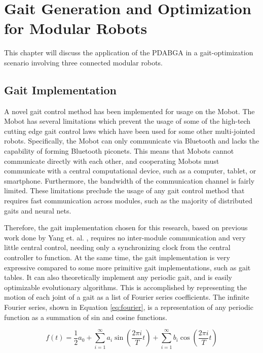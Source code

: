 \chapter{Gait Generation and Optimization for Modular Robots}
  This chapter will discuss the application of the PDABGA in a gait-optimization
    scenario involving three connected modular robots.
 
\section{Gait Implementation}
  A novel gait control method has been implemented for usage on the Mobot.
  The Mobot has several limitations which prevent the usage of some of the
    high-tech cutting edge gait control laws which have been used for some
    other multi-jointed robots. 
  Specifically, the Mobot can only communicate via Bluetooth and lacks the
    capability of forming Bluetooth piconets. 
  This means that Mobots cannot communicate directly with each other, and
    cooperating Mobots must communicate with a central computational device,
    such as a computer, tablet, or smartphone. 
  Furthermore, the bandwidth of the communication channel is fairly limited.
  These limitations preclude the usage of any gait control method that 
    requires fast communication across modules, such as the majority of 
    distributed gaits and neural nets.

  Therefore, the gait implementation chosen for this research, based on
    previous work done by Yang et. al. \cite{Yang2006}, requires no 
    inter-module communication and very little central control, needing
    only a synchronizing clock from the central controller to function.
  At the same time, the gait implementation is very expressive compared to
    some more primitive gait implementations, such as gait tables.
  It can also theoretically implement any periodic gait, and is easily
    optimizable evolutionary algorithms.
  This is accomplished by representing the motion of each joint of a gait 
    as a list of Fourier series coefficients. 
  The infinite Fourier series, shown in Equation \ref{eq:fourier}, is a
    representation of any periodic function as a summation of sin and 
    cosine functions.

  \begin{equation}
  \label{eq:fourier}
  f(t) = \frac{1}{2} a_0 + 
  \sum_{i=1}^{\infty} a_i \sin\left(\frac{2 \pi i}{T}t\right) + 
  \sum_{i=1}^{\infty} b_i \cos\left(\frac{2 \pi i}{T}t\right)
  \end{equation}
  
